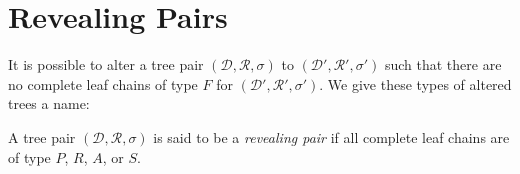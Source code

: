 \documentclass[12pt]{amsart}
\newcommand{\D}{\mathcal{D}}
\newcommand{\R}{\mathcal{R}}
\begin{document}
\begin{comment}
        \end{itemize}
    \end{remark}
    
    

    
    \begin{definition}[Types of leaves]
    
        Let $(\D,\R,\sigma)$ be a tree pair and $(l \alpha^i)_{i=0}^k$ be a leaf chain, then we call
    
        \begin{itemize}
        
            \item $l$ a \textit{repeller} of period $k$ and $l \alpha^k$ a \textit{range of repulsion} if $(l \alpha^i)_{i=0}^k$ is an $R$-chain;
            
            \item $l \alpha^k$ an \textit{attractor} of period $k$ and $l$ a \textit{domain of attraction} if $(l \alpha^i)_{i=0}^k$ is an $A$-chain;
            
            \item $l$ a \textit{source} and $l \alpha^k$ is a \textit{sink} if $(l \alpha^i)_{i=0}^k$ is a $SS$-chain.
            
        \end{itemize}
        
        We call elements of $L_\D \cap L_\R$ \textit{neutral leaves}.
    
    \end{definition}

    \end{comment}
    
    
    \section{Revealing Pairs}

        It is possible to alter a tree pair $(\D,\R,\sigma)$ to $(\D',\R',\sigma')$ such that there are no complete leaf chains of type $F$ for $(\D',\R',\sigma')$. We give these types of altered trees a name:
        
        \begin{definition}
        \label{revealing-pair}
            A tree pair $(\D,\R, \sigma)$ is said to be a \emph{revealing pair} if all complete leaf chains are of type $P$, $R$, $A$, or $S$.
        \end{definition}
        
\end{document}
